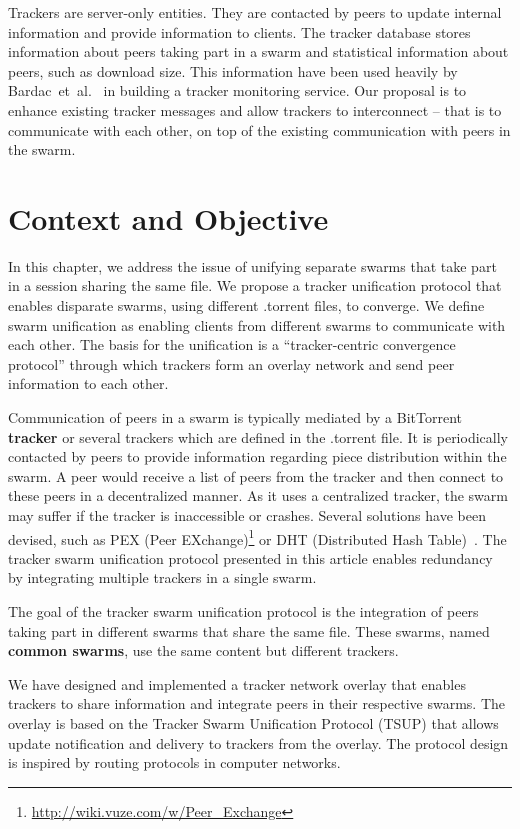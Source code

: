 Trackers are server-only entities. They are contacted by peers to update
internal information and provide information to clients. The tracker database
stores information about peers taking part in a swarm and statistical
information about peers, such as download size. This information have been
used heavily by Bardac~et~al.~\cite{tracker-mon} in building a tracker
monitoring service. Our proposal is to enhance existing tracker messages and
allow trackers to interconnect -- that is to communicate with each other, on
top of the existing communication with peers in the swarm.

\section{Context and Objective}
\label{sec:unified-tracker:context}

In this chapter, we address the issue of unifying separate swarms that take
part in a session sharing the same file. We propose a tracker unification
protocol that enables disparate swarms, using different .torrent files, to
converge. We define swarm unification as enabling clients from different
swarms to communicate with each other. The basis for the unification is a
``tracker-centric convergence protocol'' through which trackers form an
overlay network and send peer information to each other.

Communication of peers in a swarm is typically mediated by a BitTorrent
\textbf{tracker} or several trackers which are defined in the .torrent file.
It is periodically contacted by peers to provide information regarding
piece distribution within the swarm. A peer would receive a list of peers from
the tracker and then connect to these peers in a decentralized manner. As it
uses a centralized tracker, the swarm may suffer if the tracker is
inaccessible or crashes. Several solutions have been devised, such as PEX
(Peer EXchange)\footnote{\url{http://wiki.vuze.com/w/Peer\_Exchange}} or DHT
(Distributed Hash Table)~\cite{dht-paper}. The tracker swarm unification
protocol presented in this article enables redundancy by integrating multiple
trackers in a single swarm.

The goal of the tracker swarm unification protocol is the integration of peers
taking part in different swarms that share the same file. These swarms, named
\textbf{common swarms}, use the same content but different trackers.

We have designed and implemented a tracker network overlay that enables
trackers to share information and integrate peers in their respective swarms.
The overlay is based on the Tracker Swarm Unification Protocol (TSUP) that
allows update notification and delivery to trackers from the overlay. The
protocol design is inspired by routing protocols in computer networks.

